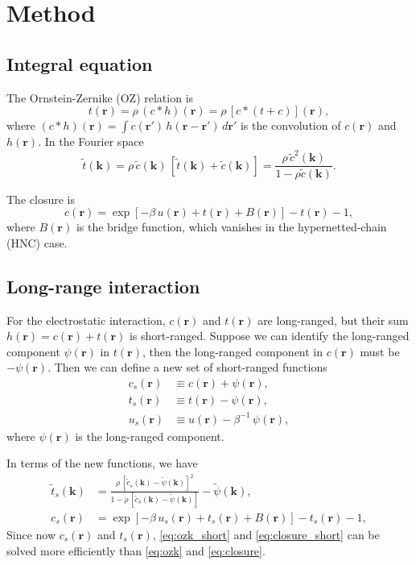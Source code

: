 \documentclass[12pt]{article}
\newcommand{\vct}[1]{\mathbf{#1}}
\providecommand{\vr}{} %
\renewcommand{\vr}{\vct{r}}
\newcommand{\vk}{\vct{k}}
\begin{document}
\section{Method}

\subsection{Integral equation}

The Ornstein-Zernike (OZ) relation is
\begin{equation}
  t(\vr) = \rho \, (c * h)(\vr)
         = \rho \, [c * (t + c)] (\vr),
  \label{eq:oz}
\end{equation}
%
where $(c * h)(\vr) = \int c(\vr') \, h(\vr - \vr') \, d\vr'$
is the convolution of $c(\vr)$ and $h(\vr)$.
%
In the Fourier space
\begin{equation}
  \tilde{t}(\vk) = \rho \, \tilde{c}(\vk) \, [\tilde{t}(\vk) + \tilde{c}(\vk)]
                 = \frac{ \rho \, \tilde{c}^2(\vk) }
                        { 1 - \rho \tilde{c}(\vk)    }.
  \label{eq:ozk}
\end{equation}

The closure is
\begin{equation}
  c(\vr) = \exp[-\beta \, u(\vr) + t(\vr) + B(\vr)] - t(\vr) - 1,
  \label{eq:closure}
\end{equation}
where $B(\vr)$ is the bridge function,
which vanishes in the hypernetted-chain (HNC) case.


\subsection{Long-range interaction}

For the electrostatic interaction,
$c(\vr)$ and $t(\vr)$ are long-ranged,
but their sum $h(\vr) = c(\vr) + t(\vr)$ is short-ranged.
%
Suppose we can identify the long-ranged component $\psi(\vr)$ in $t(\vr)$,
then the long-ranged component in $c(\vr)$ must be $-\psi(\vr)$.
%
Then we can define a new set of short-ranged functions
%
\begin{align}
  c_s(\vr)    &\equiv   c(\vr) + \psi(\vr), \label{eq:ch} \\
  t_s(\vr)    &\equiv   t(\vr) - \psi(\vr), \label{eq:th} \\
  u_s(\vr)    &\equiv   u(\vr) - \beta^{-1} \, \psi(\vr),
\end{align}
%
where $\psi(\vr)$ is the long-ranged component.


In terms of the new functions, we have
\begin{align}
  \tilde{t}_s(\vk) &= \frac{ \rho \, [ \tilde{c}_s(\vk) - \tilde{\psi}(\vk) ]^2 }
                           { 1 - \rho \, [\tilde{c}_s(\vk) - \tilde{\psi}(\vk) ] }
                      -\tilde{\psi}(\vk),
  \label{eq:ozk_short}
 \\
  c_s(\vr) &= \exp[-\beta \, u_s(\vr) + t_s(\vr) + B(\vr)] - t_s(\vr) - 1,
  \label{eq:closure_short}
\end{align}
%
Since now $c_s(\vr)$ and $t_s(\vr)$,
\eqref{eq:ozk_short} and \eqref{eq:closure_short}
can be solved more efficiently than
\eqref{eq:ozk} and \eqref{eq:closure}.
\end{document}
